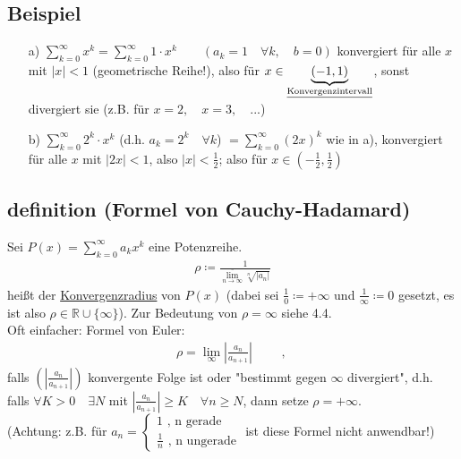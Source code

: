 \documentclass[12pt, titlepage]{article}
\newcommand{\R}{\mathds{R}}
\newcommand{\infn}{n\rightarrow\infty}
\renewcommand{\*}{\cdot}
\renewcommand{\limsup}[1]{\underset{#1}{\overline{\lim}}}
\begin{document}
 \subsection{Beispiel}
 \begin{itemize}
 	\item[a)] $\sum_{k=0}^{\infty}x^k=\sum_{k=0}^{\infty}1\*x^k\qquad(a_k=1\quad\forall k,\quad b=0)$ konvergiert für alle $x$ mit $|x|<1$ (geometrische Reihe!), also für $x\in\underbrace{(-1,1)}_{\textrm{\underline{Konvergenzintervall}}}$, sonst divergiert sie (z.B. für $x=2,\quad x=3,\quad...$)
 	\item[b)] $\sum_{k=0}^{\infty}2^k\*x^k$ (d.h. $a_k=2^k\quad\forall k$) $=\sum_{k=0}^{\infty}(2x)^k$ wie in a), konvergiert für alle $x$ mit $|2x|<1$, also $|x|<\frac{1}{2}$; also für $x\in(-\frac{1}{2},\frac{1}{2})$
 \end{itemize}
 \subsection{definition (Formel von Cauchy-Hadamard)}
 Sei $P(x)=\sum_{k=0}^{\infty}a_kx^k$ eine Potenzreihe.
 \begin{align*}
 	\rho\coloneqq\frac{1}{\limsup{\infn}\sqrt[n]{|a_n|}}
 \end{align*}
 heißt der \underline{Konvergenzradius} von $P(x)$ (dabei sei $\frac{1}{0}\coloneqq+\infty$ und $\frac{1}{\infty}\coloneqq0$ gesetzt, es ist also $\rho\in\R\cup\{\infty\}$). Zur Bedeutung von $\rho=\infty$ siehe 4.4.\\
 Oft einfacher: Formel von Euler:
 \begin{align*}
 	\rho=\lim\limits_{\infty}|\frac{a_n}{a_{n+1}}|\qquad\textrm{ , }
 \end{align*}
	falls $(|\frac{a_n}{a_{n+1}}|)$ konvergente Folge ist oder "bestimmt gegen $\infty$ divergiert", d.h. falls $\forall K>0\quad\exists N$ mit $|\frac{a_n}{a_{n+1}}|\geq K\quad\forall n\geq N$, dann setze $\rho=+\infty$.\\
	(Achtung: z.B. für $a_n=\begin{cases}
	1\textrm{ , n gerade}\\
	\frac{1}{n}\textrm{ , n ungerade}
	\end{cases}$ ist diese Formel nicht anwendbar!)
\end{document}
